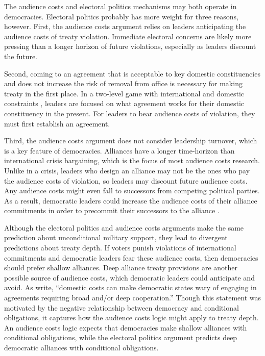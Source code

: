 \documentclass[12pt]{article}
\begin{document}
The audience costs and electoral politics mechanisms may both operate in democracies. 
Electoral politics probably has more weight for three reasons, however. 
First, the audience costs argument relies on leaders anticipating the audience costs of treaty violation.  
Immediate electoral concerns are likely more pressing than a longer horizon of future violations, especially as leaders discount the future.  


Second, coming to an agreement that is acceptable to key domestic constituencies and does not increase the risk of removal from office is necessary for making treaty in the first place. 
In a two-level game with international and domestic constraints \citep{Putnam1988}, leaders are focused on what agreement works for their domestic constituency in the present. 
For leaders to bear audience costs of violation, they must first establish an agreement. 


Third, the audience costs argument does not consider leadership turnover, which is a key feature of democracies. 
Alliances have a longer time-horizon than international crisis bargaining, which is the focus of most audience costs research. 
Unlike in a crisis, leaders who design an alliance may not be the ones who pay the audience costs of violation, so leaders may discount future audience costs. 
Any audience costs might even fall to successors from competing political parties. 
As a result, democratic leaders could increase the audience costs of their alliance commitments in order to precommit their successors to the alliance \citep{Mattes2012a}. 


Although the electoral politics and audience costs arguments make the same prediction about unconditional military support, they lead to divergent predictions about treaty depth. 
If voters punish violations of international commitments and democratic leaders fear these audience costs, then democracies should prefer shallow alliances.
Deep alliance treaty provisions are another possible source of audience costs, which democratic leaders could anticipate and avoid.
As \citet[pg. 980]{Chibaetal2015} write, ``domestic costs can make democratic states wary of engaging in agreements requiring broad and/or deep cooperation.''  
Though this statement was motivated by the negative relationship between democracy and conditional obligations, it captures how the audience costs logic might apply to treaty depth. 
An audience costs logic expects that democracies make shallow alliances with conditional obligations, while the electoral politics argument predicts deep democratic alliances with conditional obligations. 
\end{document}
